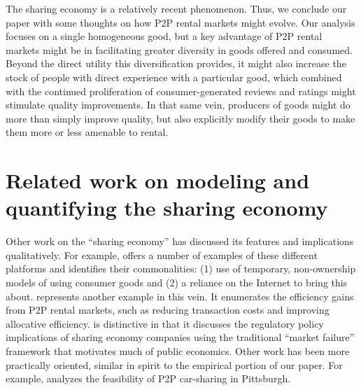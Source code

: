 \documentclass[11pt]{article}
\begin{document}
The sharing economy is a relatively recent phenomenon.
Thus, we conclude our paper with some thoughts on how P2P rental markets might evolve.
Our analysis focuses on a single homogeneous good, but a key advantage of P2P rental markets might be in facilitating greater diversity in goods offered and consumed. 
Beyond the direct utility this diversification provides, it might also increase the stock of people with direct experience with a particular good, which combined with the continued proliferation of consumer-generated reviews and ratings might stimulate quality improvements. 
In that same vein, producers of goods might do more than simply improve quality, but also explicitly modify their goods to make them more or less amenable to rental.

\section{Related work on modeling and quantifying the sharing economy}

Other work on the ``sharing economy'' has discussed its features and implications qualitatively. 
For example, \cite{belk2014you} offers a number of examples of these different platforms and identifies their commonalities: (1) use of temporary, non-ownership models of using consumer goods and (2) a reliance on the Internet to bring this about. 
\cite{edelman2015efficiencies} represents another example in this vein.
It enumerates the efficiency gains from P2P rental markets, such as reducing transaction costs and improving allocative efficiency. 
\citeauthor{edelman2015efficiencies} is distinctive in that it discusses the regulatory policy implications of sharing economy companies using the traditional ``market failure'' framework that motivates much of public economics.  
Other work has been more practically oriented, similar in spirit to the empirical portion of our paper.
For example, \cite{hampshire2011peer} analyzes the feasibility of P2P car-sharing in Pittsburgh.
\end{document}
